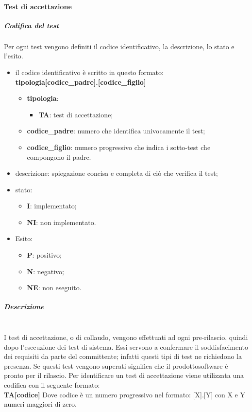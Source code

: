 	\paragraph{Test di accettazione}
		\subparagraph*{Codifica del test}
		Per ogni test vengono definiti il codice identificativo, la descrizione, lo stato e l'esito.
		\begin{itemize}
			\item il codice identificativo è scritto in questo formato:\\
			\textbf{tipologia[codice\_padre].[codice\_figlio]}
			\begin{itemize}
				\item \textbf{tipologia}:
				\begin{itemize}
					\item \textbf{TA}: test di accettazione;
				\end{itemize}
				\item \textbf{codice\_padre}: numero che identifica univocamente il test;
				\item \textbf{codice\_figlio}: numero progressivo che indica i sotto-test che compongono il padre. 
			\end{itemize}
			\item descrizione: spiegazione concisa e completa di ciò che verifica il test;
			\item stato:
			\begin{itemize}
				\item \textbf{I}: implementato;
				\item \textbf{NI}: non implementato.
			\end{itemize}
			\item Esito:
			\begin{itemize}
				\item \textbf{P}: positivo;
				\item \textbf{N}: negativo;
				\item \textbf{NE}: non eseguito.
			\end{itemize}
		\end{itemize}
		\subparagraph*{Descrizione} \mbox{}\\ [1mm]
		I test di accettazione, o di collaudo, vengono effettuati ad ogni pre-rilascio, quindi dopo l'esecuzione dei test di sistema. Essi servono a confermare il soddisfacimento dei requisiti da parte del committente; infatti questi tipi di test ne richiedono la presenza. Se questi test vengono superati significa che il prodotto\glosp software è pronto per il rilascio. 
		Per identificare un test di accettazione viene utilizzata una codifica con il seguente formato:\\
		\textbf{TA[codice]}
		Dove codice è un numero progressivo nel formato: [X].[Y] con X e Y numeri maggiori di zero.
